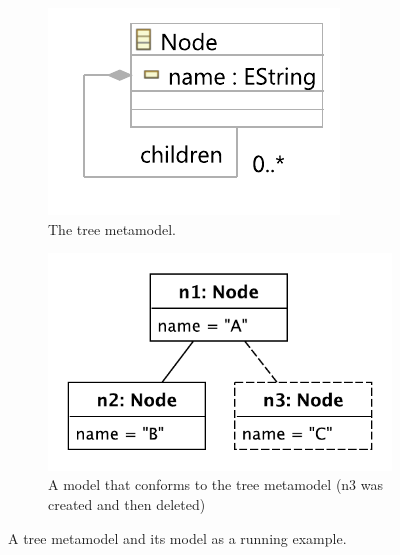 \documentclass[12pt, a4paper]{report} \usepackage[titletoc]{appendix}
\begin{document}
\begin{figure}[H]
    \begin{subfigure}[h]{0.4\linewidth}
        \centering
        \includegraphics[width=0.8\linewidth]{node_metamodel}
        \caption{The tree metamodel.}
        \label{fig:tree_metamodel}
    \end{subfigure}
    \hfill
    \begin{subfigure}[h]{0.6\linewidth}
        \centering
        \includegraphics[width=0.6\linewidth]{initial_chart}
        \caption{A model that conforms to the tree metamodel (n3 was created and then deleted)}
        \label{fig:initial_model}
    \end{subfigure}
    \caption{A tree metamodel and its model as a running example.}
    \label{fig:append_speed}
\end{figure}
\end{document}
